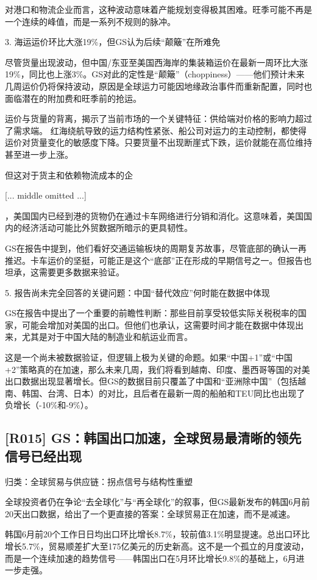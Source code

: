 \documentclass[11pt]{ctexart}
\begin{document}
对港口和物流企业而言，这种波动意味着产能规划变得极其困难。旺季可能不再是一个连续的峰值，而是一系列不规则的脉冲。

3. 海运运价环比大涨19\%，但GS认为后续“颠簸”在所难免

尽管货量出现波动，但中国/东亚至美国西海岸的集装箱运价在最新一周环比大涨19\%，同比也上涨3\%。GS对此的定性是“颠簸”（choppiness）——他们预计未来几周运价仍将保持波动，原因是全球运力可能因地缘政治事件而重新配置，同时也面临潜在的附加费和旺季前的抢运。

运价与货量的背离，揭示了当前市场的一个关键特征：供给端对价格的影响力超过了需求端。 红海绕航导致的运力结构性紧张、船公司对运力的主动控制，都使得运价对货量变化的敏感度下降。只要货量不出现断崖式下跌，运价就能在高位维持甚至进一步上涨。

但这对于货主和依赖物流成本的企

[... middle omitted ...]

，美国国内已经到港的货物仍在通过卡车网络进行分销和消化。这意味着，美国国内的经济活动可能比外贸数据所暗示的更具韧性。

GS在报告中提到，他们看好交通运输板块的周期复苏故事，尽管底部的确认一再推迟。卡车运价的坚挺，可能正是这个“底部”正在形成的早期信号之一。但报告也坦承，这需要更多数据来验证。

5. 报告尚未完全回答的关键问题：中国“替代效应”何时能在数据中体现

GS在报告中提出了一个重要的前瞻性判断：那些目前享受较低实际关税税率的国家，可能会增加对美国的出口。但他们也承认，这需要时间才能在数据中体现出来，尤其是对于中国大陆的制造业和航运业而言。

这是一个尚未被数据验证，但逻辑上极为关键的命题。如果“中国+1”或“中国+2”策略真的在加速，那么未来几周，我们将看到越南、印度、墨西哥等国的对美出口数据出现显著增长。但GS的数据目前只覆盖了中国和“亚洲除中国”（包括越南、韩国、台湾、日本）的对比，且后者在最新一周的船舶和TEU同比也出现了负增长（-10\%和-9\%）。

\subsection{[R015] GS：韩国出口加速，全球贸易最清晰的领先信号已经出现}
{\small\color{refgray}归类：全球贸易与供应链：拐点信号与结构性重塑}

全球投资者仍在争论“去全球化”与“再全球化”的叙事，但GS最新发布的韩国6月前20天出口数据，给出了一个更直接的答案：全球贸易正在加速，而不是减速。

韩国6月前20个工作日日均出口环比增长8.7\%，较前值3.1\%明显提速。总出口环比增长5.7\%，贸易顺差扩大至175亿美元的历史新高。这不是一个孤立的月度波动，而是一个连续加速的趋势信号——韩国出口在5月环比增长9.8\%的基础上，6月进一步走强。
\end{document}
